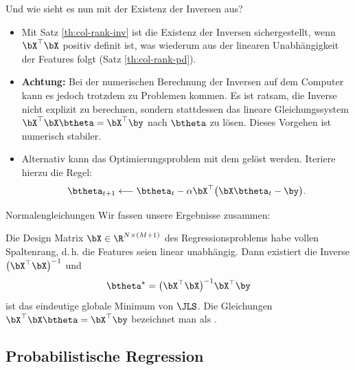 \begin{frame}{Und wie sieht es nun mit der Existenz der Inversen aus?}{}
	\begin{itemize}
		\item Mit Satz \ref{th:col-rank-inv} ist die Existenz der Inversen sichergestellt, wenn $\bX^\top \bX$ positiv definit ist,
			was wiederum aus der linearen Unabhängigkeit der Features folgt (Satz \ref{th:col-rank-pd}).
		\item \textbf{Achtung:} Bei der numerischen Berechnung der Inversen auf dem Computer kann es jedoch
			trotzdem zu Problemen kommen. Es ist ratsam, die Inverse nicht explizit zu berechnen,
			sondern stattdessen das lineare Gleichungssystem $\bX^\top \bX \btheta = \bX^\top \by$ nach $\btheta$ zu lösen.
			Dieses Vorgehen ist numerisch stabiler.
		\item Alternativ kann das Optimierungsproblem mit dem  gelöst werden.
			Iteriere hierzu die Regel:
		\begin{equation}
			\btheta_{t+1} \longleftarrow \btheta_t - \alpha \bX^\top \bigl( \bX \btheta_t - \by \bigr). 
		\end{equation}
	\end{itemize}
\end{frame}


\begin{frame}{Normalengleichungen}{}
	Wir fassen unsere Ergebnisse zusammen:
	
	\begin{mytheo}
		Die Design Matrix $\bX \in \R^{N \times (M+1)}$ des Regressionsproblems habe vollen Spaltenrang,
		d.\,h. die Features seien linear unabhängig.
		Dann existiert die Inverse $\bigl( \bX^\top \bX \bigr)^{-1}$ und
		$$\btheta^\star = \bigl( \bX^\top \bX \bigr)^{-1} \bX^\top \by$$ ist das eindeutige globale Minimum von $\JLS$.
		Die Gleichungen $\bX^\top \bX \btheta = \bX^\top \by$ bezeichnet man als .
	\end{mytheo}
\end{frame}


\subsection{Probabilistische Regression}

